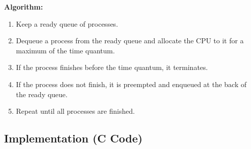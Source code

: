\documentclass[12pt,a4paper]{article}
\begin{document}
\textbf{Algorithm:}
\begin{enumerate}
    \item Keep a ready queue of processes.
    \item Dequeue a process from the ready queue and allocate the CPU to it for a maximum of the time quantum.
    \item If the process finishes before the time quantum, it terminates.
    \item If the process does not finish, it is preempted and enqueued at the back of the ready queue.
    \item Repeat until all processes are finished.
\end{enumerate}

\subsection{Implementation (C Code)}
\end{document}
